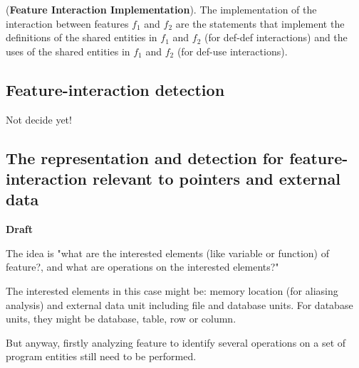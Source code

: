 \begin{Definition}{({\bf Feature Interaction Implementation}).} The implementation of the interaction between features $f_1$ and $f_2$ are the statements that implement the definitions of the shared entities in $f_1$ and $f_2$ (for def-def interactions) and the uses of the shared entities in $f_1$ and $f_2$ (for def-use interactions).
\end{Definition}
\subsection{Feature-interaction detection}
Not decide yet!





\subsection{The representation and detection for feature-interaction relevant to pointers and external data}
\textbf{Draft}

The idea is "what are the interested elements (like variable or function) of feature?, and what are operations on the interested elements?"

The interested elements in this case might be: memory location (for aliasing analysis) and external data unit including file and database units. For database units, they might be database, table, row or column.

But anyway, firstly analyzing feature to identify several operations on a set of program entities still need to be performed.